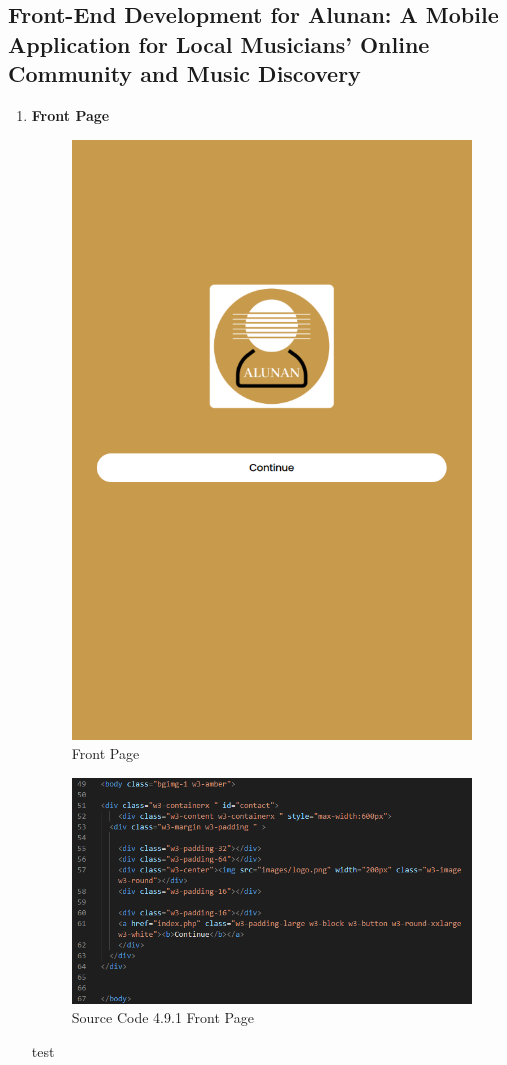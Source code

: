 \subsection{Front-End Development for Alunan: A Mobile Application for Local Musicians’ Online Community and Music Discovery}
\begin{enumerate}[1.]
    \item \textbf{Front Page}
    \begin{figure}[h]
        \centering
        \includegraphics[width=0.5\linewidth]{mainmatter/images/frontend/ss/Front Page.png}
        \caption{Front Page}
        \label{fig:myfig48}
    \end{figure}
    \begin{figure}[h]
        \centering
        \includegraphics[width=0.7\linewidth]{mainmatter/images/frontend/code/frontpage.png}
        \caption*{Source Code 4.9.1 Front Page}
        \label{fig:myfig48a}
    \end{figure}
    \pagebreak
    test


\end{enumerate}
